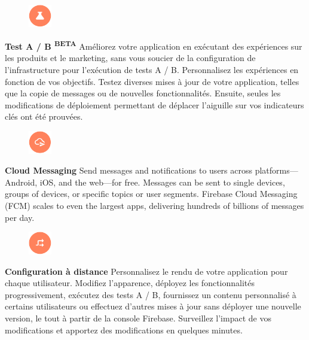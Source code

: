\begin{figure}
	\includegraphics[width=1cm]{Images/chapter2/firebase_services/a_b_testing.png}
\end{figure}
\textbf{Test A / B \textsuperscript{BETA}} Améliorez votre application en exécutant des expériences sur les produits et le marketing, sans vous soucier de la configuration de l'infrastructure pour l'exécution de tests A / B. Personnalisez les expériences en fonction de vos objectifs. Testez diverses mises à jour de votre application, telles que la copie de messages ou de nouvelles fonctionnalités. Ensuite, seules les modifications de déploiement permettant de déplacer l'aiguille sur vos indicateurs clés ont été prouvées.\medskip

\begin{figure}
	\includegraphics[width=1cm]{Images/chapter2/firebase_services/cloud_messaging.png}
\end{figure}
\textbf{Cloud Messaging} Send messages and notifications to users across platforms—Android, iOS, and the web—for free. Messages can be sent to single devices, groups of devices, or specific topics or user segments. Firebase Cloud Messaging (FCM) scales to even the largest apps, delivering hundreds of billions of messages per day.\medskip

\begin{figure}
	\includegraphics[width=1cm]{Images/chapter2/firebase_services/remote_config.png}
\end{figure}
\textbf{Configuration à distance} Personnalisez le rendu de votre application pour chaque utilisateur. Modifiez l'apparence, déployez les fonctionnalités progressivement, exécutez des tests A / B, fournissez un contenu personnalisé à certains utilisateurs ou effectuez d'autres mises à jour sans déployer une nouvelle version, le tout à partir de la console Firebase. Surveillez l'impact de vos modifications et apportez des modifications en quelques minutes.\medskip

